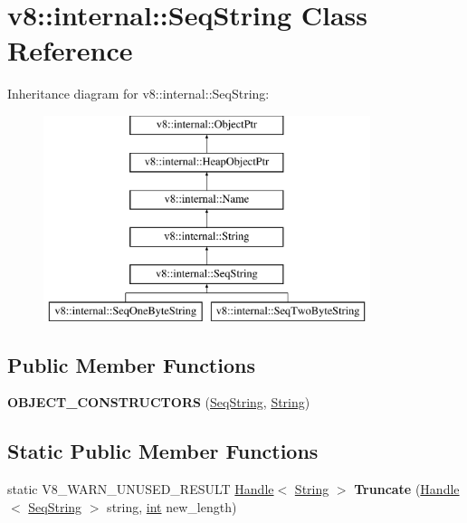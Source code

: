 \hypertarget{classv8_1_1internal_1_1SeqString}{}\section{v8\+:\+:internal\+:\+:Seq\+String Class Reference}
\label{classv8_1_1internal_1_1SeqString}
Inheritance diagram for v8\+:\+:internal\+:\+:Seq\+String\+:\begin{figure}[H]
\begin{center}
\leavevmode
\includegraphics[height=6.000000cm]{classv8_1_1internal_1_1SeqString}
\end{center}
\end{figure}
\subsection*{Public Member Functions}
\begin{DoxyCompactItemize}
\item 
\mbox{\label{classv8_1_1internal_1_1SeqString_a9df168f452ff14d07d80d28921117936}} 
{\bfseries O\+B\+J\+E\+C\+T\+\_\+\+C\+O\+N\+S\+T\+R\+U\+C\+T\+O\+RS} (\mbox{\hyperlink{classv8_1_1internal_1_1SeqString}{Seq\+String}}, \mbox{\hyperlink{classv8_1_1internal_1_1String}{String}})
\end{DoxyCompactItemize}
\subsection*{Static Public Member Functions}
\begin{DoxyCompactItemize}
\item 
\mbox{\label{classv8_1_1internal_1_1SeqString_a458de3667396155cbc7b3e5e89ea9774}} 
static V8\+\_\+\+W\+A\+R\+N\+\_\+\+U\+N\+U\+S\+E\+D\+\_\+\+R\+E\+S\+U\+LT \mbox{\hyperlink{classv8_1_1internal_1_1Handle}{Handle}}$<$ \mbox{\hyperlink{classv8_1_1internal_1_1String}{String}} $>$ {\bfseries Truncate} (\mbox{\hyperlink{classv8_1_1internal_1_1Handle}{Handle}}$<$ \mbox{\hyperlink{classv8_1_1internal_1_1SeqString}{Seq\+String}} $>$ string, \mbox{\hyperlink{classint}{int}} new\+\_\+length)
\end{DoxyCompactItemize}
